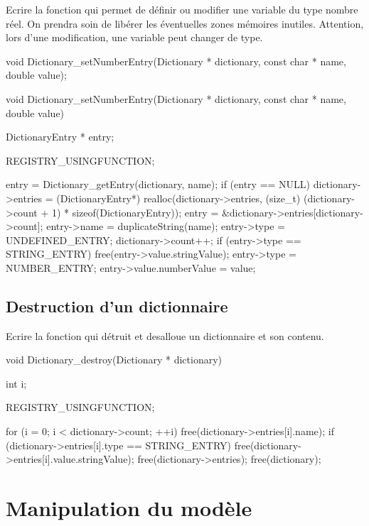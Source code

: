 Ecrire la fonction  qui permet de définir ou modifier une variable du type nombre réel. On prendra soin de libérer les éventuelles zones mémoires inutiles. Attention, lors d'une modification, une variable peut changer de type.
\begin{csource}
void Dictionary_setNumberEntry(Dictionary * dictionary, const char * name, double value);
\end{csource}
\begin{csourcecorrection}
void Dictionary_setNumberEntry(Dictionary * dictionary, const char * name, double value) {
    DictionaryEntry * entry;

    REGISTRY_USINGFUNCTION;

    entry = Dictionary_getEntry(dictionary, name);
    if (entry == NULL) {
        dictionary->entries = (DictionaryEntry*) realloc(dictionary->entries,
                (size_t) (dictionary->count + 1) * sizeof(DictionaryEntry));
        entry = &dictionary->entries[dictionary->count];
        entry->name = duplicateString(name);
        entry->type = UNDEFINED_ENTRY;
        dictionary->count++;
    }
    if (entry->type == STRING_ENTRY)
        free(entry->value.stringValue);
    entry->type = NUMBER_ENTRY;
    entry->value.numberValue = value;
}
\end{csourcecorrection}

\subsection{Destruction d'un dictionnaire}

Ecrire la fonction  qui détruit et desalloue un dictionnaire et son contenu.

\begin{csourcecorrection}
void Dictionary_destroy(Dictionary * dictionary) {
    int i;

    REGISTRY_USINGFUNCTION;

    for (i = 0; i < dictionary->count; ++i) {
        free(dictionary->entries[i].name);
        if (dictionary->entries[i].type == STRING_ENTRY)
            free(dictionary->entries[i].value.stringValue);
    }
    free(dictionary->entries);
    free(dictionary);
}
\end{csourcecorrection}

\section{Manipulation du modèle}

